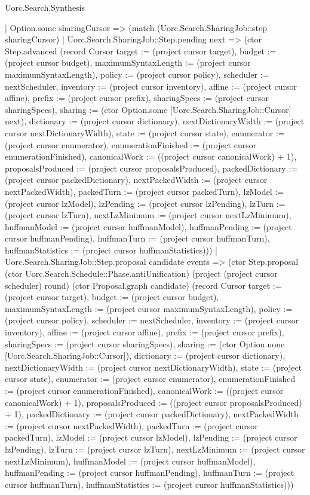 \begin{lexlean}{Uorc.Search.Synthesis}
\begin{semanticmodule}
{        | Option.some sharingCursor => (match (Uorc.Search.SharingJob::step sharingCursor)
          | Uorc.Search.SharingJob::Step.pending next => (ctor Step.advanced (record Cursor {target := (project cursor target), budget := (project cursor budget), maximumSyntaxLength := (project cursor maximumSyntaxLength), policy := (project cursor policy), scheduler := nextScheduler, inventory := (project cursor inventory), affine := (project cursor affine), prefix := (project cursor prefix), sharingSpecs := (project cursor sharingSpecs), sharing := (ctor Option.some [Uorc.Search.SharingJob::Cursor] next), dictionary := (project cursor dictionary), nextDictionaryWidth := (project cursor nextDictionaryWidth), state := (project cursor state), enumerator := (project cursor enumerator), enumerationFinished := (project cursor enumerationFinished), canonicalWork := ((project cursor canonicalWork) + 1), proposalsProduced := (project cursor proposalsProduced), packedDictionary := (project cursor packedDictionary), nextPackedWidth := (project cursor nextPackedWidth), packedTurn := (project cursor packedTurn), lzModel := (project cursor lzModel), lzPending := (project cursor lzPending), lzTurn := (project cursor lzTurn), nextLzMinimum := (project cursor nextLzMinimum), huffmanModel := (project cursor huffmanModel), huffmanPending := (project cursor huffmanPending), huffmanTurn := (project cursor huffmanTurn), huffmanStatistics := (project cursor huffmanStatistics)}))
          | Uorc.Search.SharingJob::Step.proposal candidate events => (ctor Step.proposal (ctor Uorc.Search.Schedule::Phase.antiUnification) (project (project cursor scheduler) round) (ctor Proposal.graph candidate) (record Cursor {target := (project cursor target), budget := (project cursor budget), maximumSyntaxLength := (project cursor maximumSyntaxLength), policy := (project cursor policy), scheduler := nextScheduler, inventory := (project cursor inventory), affine := (project cursor affine), prefix := (project cursor prefix), sharingSpecs := (project cursor sharingSpecs), sharing := (ctor Option.none [Uorc.Search.SharingJob::Cursor]), dictionary := (project cursor dictionary), nextDictionaryWidth := (project cursor nextDictionaryWidth), state := (project cursor state), enumerator := (project cursor enumerator), enumerationFinished := (project cursor enumerationFinished), canonicalWork := ((project cursor canonicalWork) + 1), proposalsProduced := ((project cursor proposalsProduced) + 1), packedDictionary := (project cursor packedDictionary), nextPackedWidth := (project cursor nextPackedWidth), packedTurn := (project cursor packedTurn), lzModel := (project cursor lzModel), lzPending := (project cursor lzPending), lzTurn := (project cursor lzTurn), nextLzMinimum := (project cursor nextLzMinimum), huffmanModel := (project cursor huffmanModel), huffmanPending := (project cursor huffmanPending), huffmanTurn := (project cursor huffmanTurn), huffmanStatistics := (project cursor huffmanStatistics)}))
}
\end{semanticmodule}
\end{lexlean}
